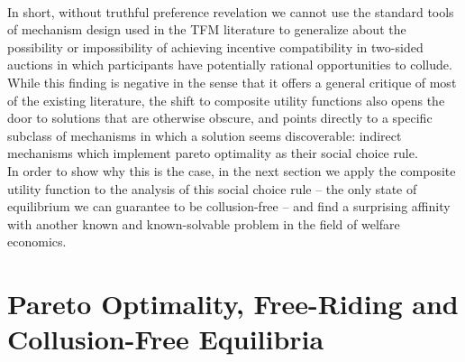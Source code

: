 \documentclass[11pt,a4paper]{llncs}
\begin{document}
\vspace{0.2cm} \\
In short, without truthful preference revelation we cannot use the standard tools of mechanism design used in the TFM literature to generalize about the possibility or impossibility of achieving incentive compatibility in two-sided auctions in which participants have potentially rational opportunities to collude. While this finding is negative in the sense that it offers a general critique of most of the existing literature, the shift to composite utility functions also opens the door to solutions that are otherwise obscure, and points directly to a specific subclass of mechanisms in which a solution seems discoverable: indirect mechanisms which implement pareto optimality as their social choice rule.
\vspace{0.2cm} \\
In order to show why this is the case, in the next section we apply the composite utility function to the analysis of this social choice rule -- the only state of equilibrium we can guarantee to be collusion-free -- and find a surprising affinity with another known and known-solvable problem in the field of welfare economics.





\section*{Pareto Optimality, Free-Riding and Collusion-Free Equilibria}
\end{document}
